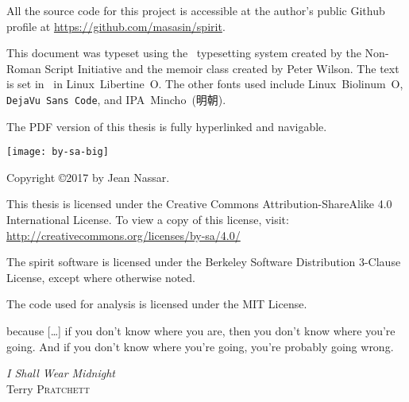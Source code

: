 \begin{titlingpage}
\maketitle
\thispagestyle{empty}

\clearpage
\null\vfill
\noindent \emph{\mytitle}

\noindent \emph{\mytitlejp}
\vspace{1em}

\noindent All the source code for this project is accessible at the author's public Github profile at \url{https://github.com/masasin/spirit}.
\vspace{1em}

\noindent This document was typeset using the \XeTeX\ typesetting system created by the Non-Roman Script Initiative and the \textsf{memoir} class created by Peter Wilson.
The text is set in \mytextsize\ in Linux~Libertine~O.
The other fonts used include \textsf{Linux~Biolinum~O}, \texttt{DejaVu~Sans~Code}, and IPA~Mincho~(明朝).
\vspace{1em}

\noindent The PDF version of this thesis is fully hyperlinked and navigable.
\vspace{1em}

\noindent \texttt{[image: by-sa-big]}

\noindent
Copyright \copyright 2017 by Jean Nassar.

\noindent This thesis is licensed under the Creative Commons Attribution-ShareAlike 4.0 International License.
To view a copy of this license, visit:\\
\url{http://creativecommons.org/licenses/by-sa/4.0/}

\noindent The \acrshort{spirit} software is licensed under the Berkeley Software Distribution 3-Clause License, except where otherwise noted.

\noindent The code used for analysis is licensed under the MIT License.
\end{titlingpage}


\thispagestyle{empty}
\setlength{\epigraphwidth}{0.7\textwidth}
\null\vfill
\epigraph{
  because [\ldots] if you don't know where you are, then you don't know where you're going.
  And if you don't know where you're going, you're probably going wrong.}
  {\emph{I Shall Wear Midnight}\\
   Terry \textsc{Pratchett}}
\vfill\vfill\null

